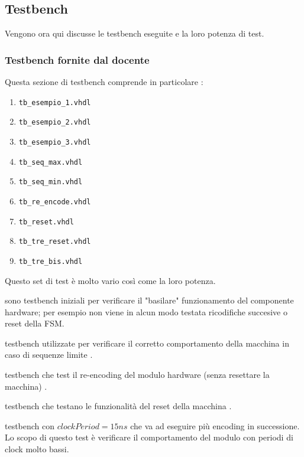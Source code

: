 \documentclass[11pt,a4paper]{article}
\begin{document}
        \subsection{Testbench}
                Vengono ora qui discusse le testbench eseguite e la loro potenza di test.
                    \subsubsection{Testbench fornite dal docente} \label{cap:test_bench_docente}
                        Questa sezione di testbench comprende in particolare :
                        \begin{enumerate}
                            \item \texttt{tb\_esempio\_1.vhdl}
                            \item \texttt{tb\_esempio\_2.vhdl}
                            \item \texttt{tb\_esempio\_3.vhdl}
                            \item \texttt{tb\_seq\_max.vhdl}
                            \item \texttt{tb\_seq\_min.vhdl}
                            \item \texttt{tb\_re\_encode.vhdl}
                            \item \texttt{tb\_reset.vhdl}
                            \item \texttt{tb\_tre\_reset.vhdl}
                            \item \texttt{tb\_tre\_bis.vhdl}
                        \end{enumerate}
                        Questo set di test è molto vario così come la loro potenza.
                        \begin{description}[leftmargin = 0cm]
                            \item[Test 1, 2 e 3 : ] sono testbench iniziali per verificare il "basilare" funzionamento del componente hardware; per esempio non viene in alcun modo testata ricodifiche succesive o reset della FSM. 
                            \item[Test 4 e 5 : ] testbench utilizzate per verificare il corretto comportamento della macchina in caso di sequenze limite .
                            \item[Test 6 : ] testbench che test il re-encoding del modulo hardware (senza resettare la macchina) .
                            \item[Test 7 e 8 : ] testbench che testano le funzionalità del reset della macchina .
                            \item[Test 9 : ] testbench con $clockPeriod = 15ns$ che va ad eseguire più encoding in successione. Lo scopo di questo test è verificare il comportamento del modulo con periodi di clock molto bassi. 
                        \end{description} 
\end{document}
